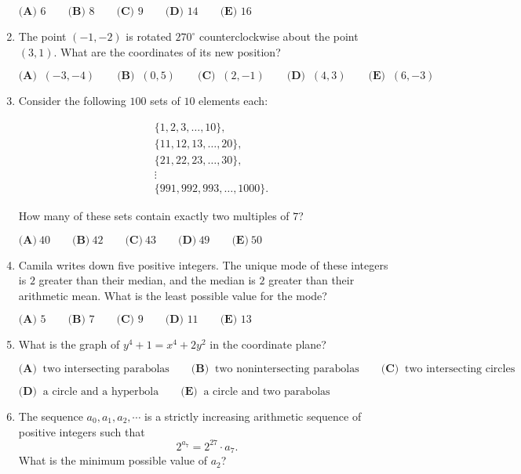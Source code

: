\documentclass{article}
\begin{document}
\begin{enumerate}[label=\arabic*., itemsep=0.5em]
$\textbf{(A) }6 \qquad \textbf{(B) }8 \qquad \textbf{(C) }9 \qquad \textbf{(D) }14 \qquad \textbf{(E) }16$\par \vspace{0.5em}\item The point $(-1, -2)$ is rotated $270^{\circ}$ counterclockwise about the point $(3, 1)$. What are the coordinates of its new position?

$\textbf{(A) }\ (-3, -4) \qquad \textbf{(B) }\ (0,5) \qquad \textbf{(C) }\ (2,-1) \qquad \textbf{(D) }\ (4,3) \qquad \textbf{(E) }\ (6,-3)$\par \vspace{0.5em}\item Consider the following $100$ sets of $10$ elements each:

\begin{align*}
&\{1,2,3,\ldots,10\}, \\
&\{11,12,13,\ldots,20\},\\
&\{21,22,23,\ldots,30\},\\
&\vdots\\
&\{991,992,993,\ldots,1000\}.
\end{align*}

How many of these sets contain exactly two multiples of $7$?

$\textbf{(A)}\ 40\qquad\textbf{(B)}\ 42\qquad\textbf{(C)}\ 43\qquad\textbf{(D)}\ 49\qquad\textbf{(E)}\ 50$\par \vspace{0.5em}\item Camila writes down five positive integers. The unique mode of these integers is $2$ greater than their median, and the median is $2$ greater than their arithmetic mean. What is the least possible value for the mode?

$\textbf{(A) }5\qquad\textbf{(B) }7\qquad\textbf{(C) }9\qquad\textbf{(D) }11\qquad\textbf{(E) }13$\par \vspace{0.5em}\item What is the graph of $y^4+1=x^4+2y^2$ in the coordinate plane?

$\textbf{(A) }\ \text{two intersecting parabolas} \qquad \textbf{(B) }\ \text{two nonintersecting parabolas} \qquad \textbf{(C) }\ \text{two intersecting circles} \qquad$

$\textbf{(D) }\ \text{a circle and a hyperbola} \qquad \textbf{(E) }\ \text{a circle and two parabolas}$\par \vspace{0.5em}\item The sequence $a_0,a_1,a_2,\cdots$ is a strictly increasing arithmetic sequence of positive integers such that 
\begin{equation*}
2^{a_7}=2^{27} \cdot a_7.
\end{equation*}
 What is the minimum possible value of $a_2$?


\end{enumerate}
\end{document}
